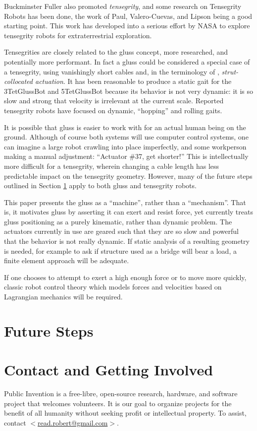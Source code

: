 \documentclass[11pt]{article}
\begin{document}
Buckminster Fuller also promoted \emph{tensegrity}, and some research on Tensegrity Robots has been done, the
work of Paul, Valero-Cuevas, and Lipson\cite{paul2006} being a good starting point.
This work has developed into a serious effort\cite{NTRT} by NASA to explore tensegrity robots for extraterrestrial
exploration.

Tensegrities are closely related to the gluss concept, more researched, and potentially more performant.
In fact a gluss could be considered a special case of a tensegrity, using vanishingly short cables
and, in the terminology of \cite{paul2006}, \emph{strut-collocated actuation}.
It has been reasonable to produce a static gait for the 3TetGlussBot and 5TetGlussBot because its behavior is not
very dynamic: it is so slow and strong that velocity is irrelevant at the current scale.
Reported tensegrity robots have focused on dynamic, ``hopping'' and rolling gaits.

It is possible that gluss is easier to work with for an actual human being on the ground.
Although of course both systems will use computer control systems, one can imagine a large robot
crawling into place imperfectly, and some workperson making a manual adjustment: ``Actuator \#37, get shorter!''
This is intellectually more difficult for a tensegrity, wherein changing a cable length
has less predictable impact on the tensegrity geometry.
However, many
of the future steps outlined in Section \ref{futuresteps} apply to both gluss and tensegrity robots.

This paper presents the gluss as a ``machine'', rather than a ``mechanism''. That is, it motivates gluss
by asserting it can exert and resist force, yet currently treats gluss positioning as a purely kinematic,
rather than dynamic problem. The actuators currently in use are geared such that they are so slow
and powerful that the behavior is not really dynamic. If static analysis of a resulting geometry is
needed, for example to ask if structure used as a bridge will bear a load, a finite element approach\cite{géradin2001flexible}
will be adequate.

If one chooses to attempt to exert a high enough force or to move more quickly, classic robot control theory
which models forces and velocities based on Lagrangian mechanics will be required.


\section{Future Steps}
\label{futuresteps}

\section{Contact and Getting Involved}

Public Invention
is a free-libre, open-source research, hardware, and software project that welcomes volunteers.
It is our goal to organize projects for the benefit of all humanity without seeking profit or intellectual property.
To assist, contact \href{mailto:read.robert@gmail.com}{$<$read.robert@gmail.com$>$}.



\end{document}
